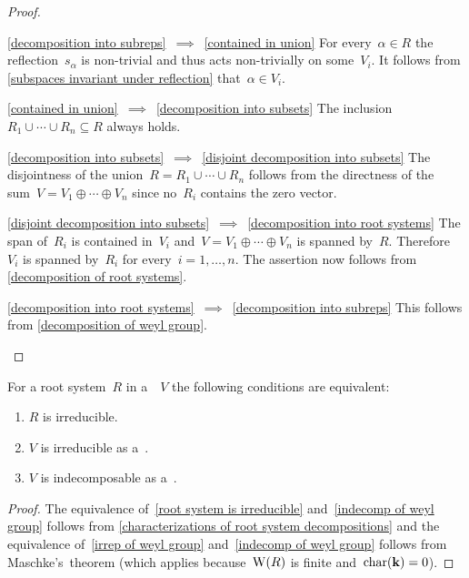 \begin{proof}
  \leavevmode
  \begin{implicationlist}
    \item[\ref*{decomposition into subreps}~$\implies$~\ref*{contained in union}]
      For every~$\alpha \in R$ the reflection~$s_\alpha$ is non-trivial and thus acts non-trivially on some~$V_i$.
      It follows from \cref{subspaces invariant under reflection} that~$\alpha \in V_i$.
    \item[\ref*{contained in union}~$\implies$~\ref*{decomposition into subsets}]
      The inclusion~$R_1 \cup \dotsb \cup R_n \subseteq R$ always holds.
    \item[\ref*{decomposition into subsets}~$\implies$~\ref*{disjoint decomposition into subsets}]
      The disjointness of the union~$R = R_1 \cup \dotsb \cup R_n$ follows from the directness of the sum~$V = V_1 \oplus \dotsb \oplus V_n$ since no~$R_i$ contains the zero vector.
    \item[\ref*{disjoint decomposition into subsets}~$\implies$~\ref*{decomposition into root systems}]
      The span of~$R_i$ is contained in~$V_i$ and~$V = V_1 \oplus \dotsb \oplus V_n$ is spanned by~$R$.
      Therefore~$V_i$ is spanned by~$R_i$ for every~$i = 1, \dotsc, n$.
      The assertion now follows from \cref{decomposition of root systems}.
    \item[\ref*{decomposition into root systems}~$\implies$~\ref*{decomposition into subreps}]
      This follows from \cref{decomposition of weyl group}.
    \qedhere
  \end{implicationlist}
\end{proof}


\begin{corollary}
  For a root system~$R$ in a~{\vectorspace{$\kf$}}~$V$ the following conditions are equivalent:
  \begin{enumerate}
    \item
      \label{root system is irreducible}
      $R$ is irreducible.
    \item
      \label{irrep of weyl group}
      $V$ is irreducible as a~{}.
    \item
      \label{indecomp of weyl group}
      $V$ is indecomposable as a~{}.
  \end{enumerate}
\end{corollary}


\begin{proof}
  The equivalence of~\ref*{root system is irreducible} and~\ref*{indecomp of weyl group} follows from \cref{characterizations of root system decompositions} and the equivalence of~\ref*{irrep of weyl group} and~\ref*{indecomp of weyl group} follows from Maschke’s~theorem (which applies because~$\operatorname{W}(R)$ is finite and~$\operatorname{char}(\mathbf{k}) = 0$).
\end{proof}


